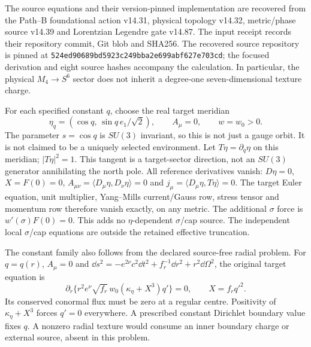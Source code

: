 The source equations and their version-pinned implementation are recovered
from the Path--B foundational action v14.31, physical topology v14.32,
metric/phase source v14.39 and Lorentzian Legendre gate v14.87.
The input receipt records their repository commit, Git blob and SHA256.
The recovered source repository is pinned at
\texttt{524ed90689bd5923c249bba2e699abf627e703cd};
the focused derivation and eight source hashes accompany the calculation.
In particular, the physical $M_4\to S^6$ sector does not inherit a
degree-one seven-dimensional texture charge.

For each specified constant $q$, choose the real target meridian
\begin{equation}
 \eta_q=(\cos q,\,\sin q\,e_1/\sqrt2),\qquad A_\mu=0,
 \qquad w=w_0>0 .
 \label{eq:sl-eta-family}
\end{equation}
The parameter $s=\cos q$ is $SU(3)$ invariant, so this is not just a
gauge orbit. It is not claimed to be a uniquely selected environment.
Let $T\eta=\partial_q\eta$ on this meridian; $|T\eta|^2=1$.
This tangent is a target-sector direction, not an $SU(3)$ generator
annihilating the north pole.
All reference derivatives vanish: $D\eta=0$, $X=F(0)=0$,
$A_{\mu\nu}=\langle D_\mu\eta,D_\nu\eta\rangle=0$ and
$j_\mu=\langle D_\mu\eta,T\eta\rangle=0$.
The target Euler equation, unit multiplier, Yang--Mills current/Gauss
row, stress tensor and momentum row therefore vanish exactly, on any
metric. The additional $\sigma$ force is $w'(\sigma)F(0)=0$.
This adds no $\eta$-dependent $\sigma$/cap source. The independent local
$\sigma$/cap equations are outside the retained effective truncation.

The constant family also follows from the declared source-free radial
problem. For $q=q(r)$, $A_\mu=0$ and
$\dd s^2=-e^{2\nu}c^2\dd t^2+f_r^{-1}\dd r^2+r^2\dd\Omega^2$,
the original target equation is
\begin{equation}
 \partial_r\{r^2e^\nu\sqrt{f_r}\,w_0
       (\kappa_\eta+X^3)q'\}=0,\qquad X=f_r q'^2 .
 \label{eq:sl-radial-target}
\end{equation}
Its conserved conormal flux must be zero at a regular centre. Positivity
of $\kappa_\eta+X^3$ forces $q'=0$ everywhere. A prescribed constant
Dirichlet boundary value fixes $q$. A nonzero radial texture would consume
an inner boundary charge or external source, absent in this problem.

